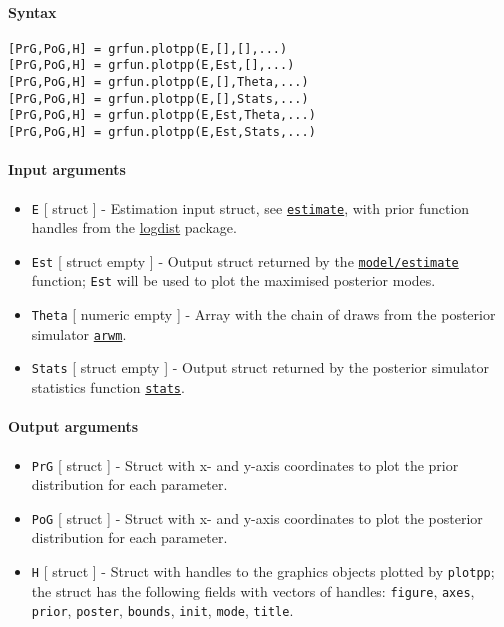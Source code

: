 


	\paragraph{Syntax}\label{syntax}

\begin{verbatim}
[PrG,PoG,H] = grfun.plotpp(E,[],[],...)
[PrG,PoG,H] = grfun.plotpp(E,Est,[],...)
[PrG,PoG,H] = grfun.plotpp(E,[],Theta,...)
[PrG,PoG,H] = grfun.plotpp(E,[],Stats,...)
[PrG,PoG,H] = grfun.plotpp(E,Est,Theta,...)
[PrG,PoG,H] = grfun.plotpp(E,Est,Stats,...)
\end{verbatim}

\paragraph{Input arguments}\label{input-arguments}

\begin{itemize}
\item
  \texttt{E} {[} struct {]} - Estimation input struct, see
  \href{model/estimate}{\texttt{estimate}}, with prior function handles
  from the \href{logdist/Contents}{logdist} package.
\item
  \texttt{Est} {[} struct \textbar{} empty {]} - Output struct returned
  by the \href{model/estimate}{\texttt{model/estimate}} function;
  \texttt{Est} will be used to plot the maximised posterior modes.
\item
  \texttt{Theta} {[} numeric \textbar{} empty {]} - Array with the chain
  of draws from the posterior simulator
  \href{poster/arwm}{\texttt{arwm}}.
\item
  \texttt{Stats} {[} struct \textbar{} empty {]} - Output struct
  returned by the posterior simulator statistics function
  \href{poster/stats}{\texttt{stats}}.
\end{itemize}

\paragraph{Output arguments}\label{output-arguments}

\begin{itemize}
\item
  \texttt{PrG} {[} struct {]} - Struct with x- and y-axis coordinates to
  plot the prior distribution for each parameter.
\item
  \texttt{PoG} {[} struct {]} - Struct with x- and y-axis coordinates to
  plot the posterior distribution for each parameter.
\item
  \texttt{H} {[} struct {]} - Struct with handles to the graphics
  objects plotted by \texttt{plotpp}; the struct has the following
  fields with vectors of handles: \texttt{figure}, \texttt{axes},
  \texttt{prior}, \texttt{poster}, \texttt{bounds}, \texttt{init},
  \texttt{mode}, \texttt{title}.
\end{itemize}

